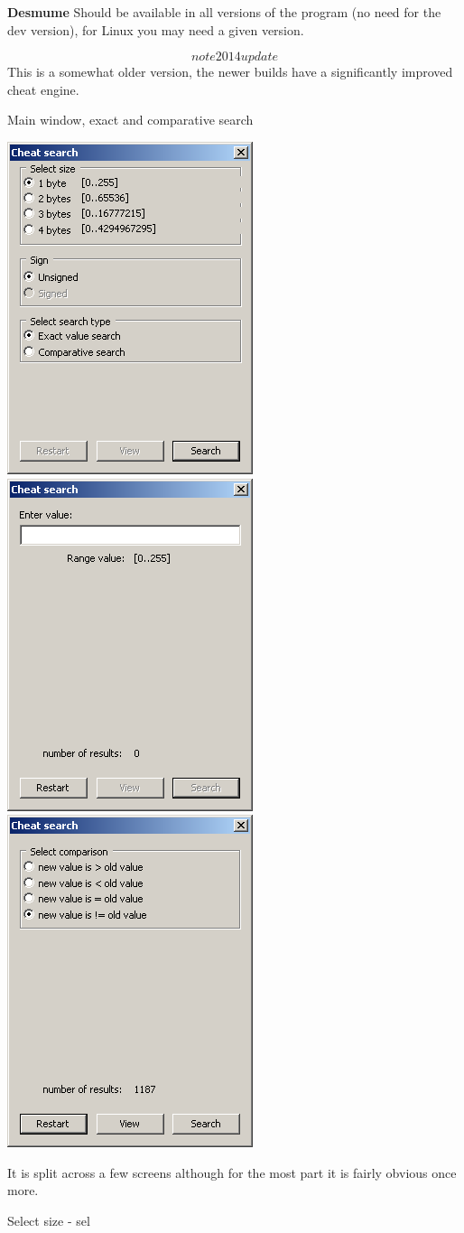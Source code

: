 \documentclass[
]{book}
\begin{document}
\textbf{Desmume} Should be available in all versions of the program (no need for the dev version), for Linux you may need a given version.

\[note 2014 update\] This is a somewhat older version, the newer builds have a significantly improved cheat engine.

Main window, exact and comparative search

\includegraphics{images/196_home_fast6191_romhackingguide_unrenamed_fil___ginal_borders_romhackingguideDSdesmumecheat.png}\includegraphics{images/197_home_fast6191_romhackingguide_unrenamed_fil___inal_borders_romhackingguidedsdesmumecheat3.png}\includegraphics{images/198_home_fast6191_romhackingguide_unrenamed_fil___nal_borders_romhackingguidedsdesmumecheats2.png}

It is split across a few screens although for the most part it is fairly obvious once more.

Select size - sel
\end{document}
